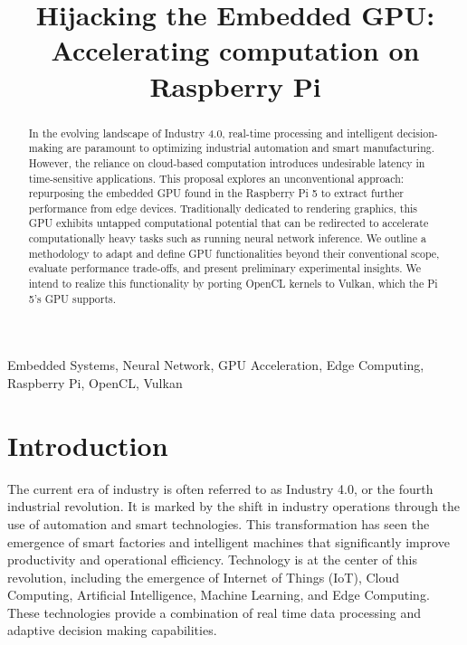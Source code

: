 \documentclass[conference]{IEEEtran}
\begin{document}
 \nocite{*}
 
 \title{Hijacking the Embedded GPU: Accelerating computation on Raspberry Pi\\}
 
 \author{
 }
 
 \maketitle
 
 \begin{abstract}
    In the evolving landscape of Industry 4.0, real-time processing and intelligent decision-making are 
    paramount to optimizing industrial automation and smart manufacturing. However, the reliance on 
    cloud-based computation introduces undesirable latency in time-sensitive applications. This 
    proposal explores an unconventional approach: repurposing the embedded GPU found in the Raspberry Pi 5
    to extract further performance from edge devices. Traditionally dedicated to rendering graphics, this GPU exhibits 
    untapped computational potential that can be redirected to accelerate computationally heavy tasks 
    such as running neural network inference. 
    We outline a methodology to adapt and define GPU functionalities beyond their conventional 
    scope, evaluate performance trade-offs, and present preliminary experimental insights. 
    We intend to realize this functionality by porting OpenCL kernels to Vulkan, which the Pi 5's 
    GPU supports. 
 \end{abstract}
 
 \begin{IEEEkeywords}
 Embedded Systems, Neural Network, GPU Acceleration, Edge Computing, Raspberry Pi, OpenCL, Vulkan
 \end{IEEEkeywords}
 
 \section{Introduction}

 The current era of industry is often referred to as Industry 4.0, or the fourth 
 industrial revolution. It is marked by the shift in industry operations through the 
 use of automation and smart technologies. This transformation has seen the emergence 
 of smart factories and intelligent machines that significantly improve productivity and 
 operational efficiency. Technology is at the center of this revolution, including the 
 emergence of Internet of Things (IoT), Cloud Computing, Artificial Intelligence, Machine
 Learning, and Edge Computing. These technologies provide a combination of real time data 
 processing and adaptive decision making capabilities. 
 
\end{document}
